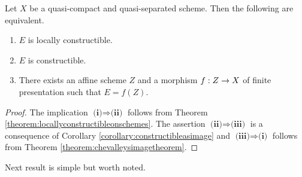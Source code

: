 \begin{corollary}\label{corollary:locallyconstructibelonqcqs}
Let $X$ be a quasi-compact and quasi-separated scheme. Then the following are equivalent.
\begin{enumerate}[label=\emph{\textbf{(\roman*)}}, leftmargin=*]
\item $E$ is locally constructible.
\item $E$ is constructible.
\item There exists an affine scheme $Z$ and a morphism $f:Z\rightarrow X$ of finite presentation such that $E = f(Z)$.
\end{enumerate}
\end{corollary}
\begin{proof}
The implication $\textbf{(i)}\Rightarrow \textbf{(ii)}$ follows from Theorem \ref{theorem:locallyconstructibleonschemes}. The assertion $\textbf{(ii)} \Rightarrow \textbf{(iii)}$ is a consequence of Corollary \ref{corollary:constructibleasimage} and $\textbf{(iii)}\Rightarrow \textbf{(i)}$ follows from Theorem \ref{theorem:chevalleysimagetheorem}.
\end{proof}
\noindent
Next result is simple but worth noted.

